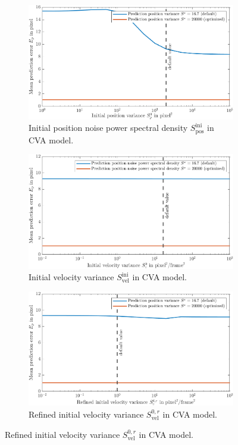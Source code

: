 \begin{figure}
    \centering
	\begin{subfigure}[t]{0.8\textwidth}
		\includegraphics[width=\textwidth]{figures/KF/appendix/inip cva.png}
		\caption{Initial position noise power spectral density $S_{\mathrm{pos}}^{\mathrm{ini}}$ in CVA model.}
	\end{subfigure}
	\begin{subfigure}[t]{0.8\textwidth}
		\includegraphics[width=\textwidth]{figures/KF/appendix/iniv cva.png}
		\caption{Initial velocity variance $S_{\mathrm{vel}}^{\mathrm{ini}}$ in CVA model.}
	\end{subfigure}
	\begin{subfigure}[t]{0.8\textwidth}
		\includegraphics[width=\textwidth]{figures/KF/appendix/inirv cva.png}
		\caption{Refined initial velocity variance $S_{\mathrm{vel}}^{0,r}$ in CVA model.}
	\end{subfigure}
\end{figure}

